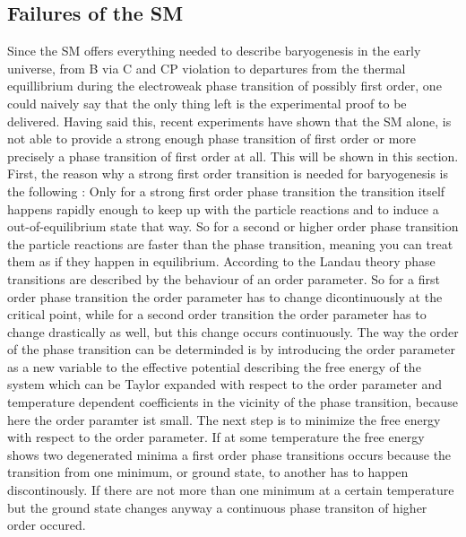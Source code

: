 \subsection{Failures of the SM}
Since the SM offers everything needed to describe baryogenesis in the early universe, from B via C and CP violation to departures from the thermal equillibrium during the electroweak phase transition of possibly first order, one could naively say that the only thing left is the experimental proof to be delivered. \newline\indent
Having said this, recent experiments have shown that the SM alone, is not able to provide a strong enough phase transition of first order or more precisely a phase transition of first order at all. This will be shown in this section. \newline\indent
First, the reason why a strong first order transition is needed for baryogenesis is the following \cite[p. 25]{Bernreuther:2002uj}: Only for a strong first order phase transition the transition itself happens rapidly enough to keep up with the particle reactions and to induce a out-of-equilibrium state that way. So for a second or higher order phase transition the particle reactions are faster than the phase transition, meaning you can treat them as if they happen in equilibrium.\newline\indent
According to the Landau theory phase transitions are described by the behaviour of an order parameter. So for a first order phase transition the order parameter has to change dicontinuously at the critical point, while for a second order transition the order parameter has to change drastically as well, but this change occurs continuously. The way the order of the phase transition can be determinded is by introducing the order parameter as a new variable to the effective potential describing the free energy of the system which can be Taylor expanded with respect to the order parameter and temperature dependent coefficients in the vicinity of the phase transition, because here the order paramter ist small. The next step is to minimize the free energy with respect to the order parameter. If at some temperature the free energy shows two degenerated minima a first order phase transitions occurs because the transition from one minimum, or ground state, to another has to happen discontinously. If there are not more than one minimum at a certain temperature but the ground state changes anyway a continuous phase transiton of higher order occured. 
\newline \indent
